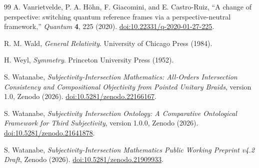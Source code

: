 \documentclass[11pt]{article}
\theoremstyle{definition}
\theoremstyle{remark}
\begin{document}
\begin{thebibliography}{99}
A. Vanrietvelde, P. A. H\"ohn, F. Giacomini, and E. Castro-Ruiz, ``A change of perspective: switching quantum reference frames via a perspective-neutral framework,'' \emph{Quantum} \textbf{4}, 225 (2020). \href{https://doi.org/10.22331/q-2020-01-27-225}{doi:10.22331/q-2020-01-27-225}.

R. M. Wald, \emph{General Relativity}. University of Chicago Press (1984).

H. Weyl, \emph{Symmetry}. Princeton University Press (1952).

S. Watanabe, \emph{Subjectivity-Intersection Mathematics: All-Orders Intersection Consistency and Compositional Objectivity from Pointed Unitary Braids}, version 1.0, Zenodo (2026). \href{https://doi.org/10.5281/zenodo.22166167}{doi:10.5281/zenodo.22166167}.

S. Watanabe, \emph{Subjectivity Intersection Ontology: A Comparative Ontological Framework for Third Subjectivity}, version 1.0.0, Zenodo (2026). \href{https://doi.org/10.5281/zenodo.21641878}{doi:10.5281/zenodo.21641878}.

S. Watanabe, \emph{Subjectivity-Intersection Mathematics Public Working Preprint v4.2 Draft}, Zenodo (2026). \href{https://doi.org/10.5281/zenodo.21909933}{doi:10.5281/zenodo.21909933}.

\end{thebibliography}
\end{document}

